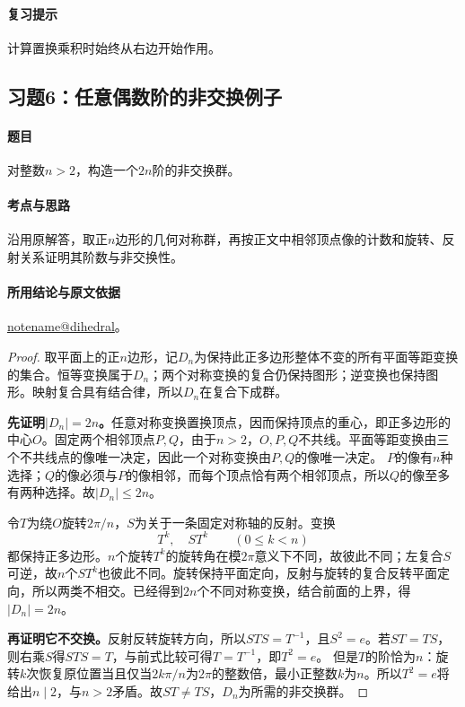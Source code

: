 \documentclass[UTF8,a4paper,11pt,fontset=windows]{ctexart}
\makeatletter
\newcommand{\noteref}[1]{\hyperref[note:#1]{\csname notename@#1\endcsname}}
\newcommand{\exref}[2]{\hyperref[ex:#1:#2]{第#1章习题#2}}
\makeatother
\begin{document}
\paragraph{复习提示}
计算置换乘积时始终从右边开始作用。


\subsection{习题6：\texorpdfstring{任意偶数阶的非交换例子}{任意偶数阶的非交换例子}}
\label{ex:1:6}

\paragraph{题目}
对整数$n>2$，构造一个$2n$阶的非交换群。

\paragraph{考点与思路}
沿用原解答，取正$n$边形的几何对称群，再按正文中相邻顶点像的计数和旋转、反射关系证明其阶数与非交换性。

\paragraph{所用结论与原文依据}
\noteref{dihedral}。


\begin{proof}
取平面上的正$n$边形，记$D_n$为保持此正多边形整体不变的所有平面等距变换的集合。恒等变换属于$D_n$；两个对称变换的复合仍保持图形；逆变换也保持图形。映射复合具有结合律，所以$D_n$在复合下成群。

\textbf{先证明$|D_n|=2n$。}任意对称变换置换顶点，因而保持顶点的重心，即正多边形的中心$O$。固定两个相邻顶点$P,Q$，由于$n>2$，$O,P,Q$不共线。平面等距变换由三个不共线点的像唯一决定，因此一个对称变换由$P,Q$的像唯一决定。
$P$的像有$n$种选择；$Q$的像必须与$P$的像相邻，而每个顶点恰有两个相邻顶点，所以$Q$的像至多有两种选择。故$|D_n|\leq2n$。

令$T$为绕$O$旋转$2\pi/n$，$S$为关于一条固定对称轴的反射。变换
\[
T^k,\quad ST^k\qquad(0\leq k<n)
\]
都保持正多边形。$n$个旋转$T^k$的旋转角在模$2\pi$意义下不同，故彼此不同；左复合$S$可逆，故$n$个$ST^k$也彼此不同。旋转保持平面定向，反射与旋转的复合反转平面定向，所以两类不相交。已经得到$2n$个不同对称变换，结合前面的上界，得$|D_n|=2n$。

\textbf{再证明它不交换。}反射反转旋转方向，所以$STS=T^{-1}$，且$S^2=e$。若$ST=TS$，则右乘$S$得$STS=T$，与前式比较可得$T=T^{-1}$，即$T^2=e$。
但是$T$的阶恰为$n$：旋转$k$次恢复原位置当且仅当$2k\pi/n$为$2\pi$的整数倍，最小正整数$k$为$n$。所以$T^2=e$将给出$n\mid2$，与$n>2$矛盾。故$ST\ne TS$，$D_n$为所需的非交换群。
\end{proof}
\end{document}
